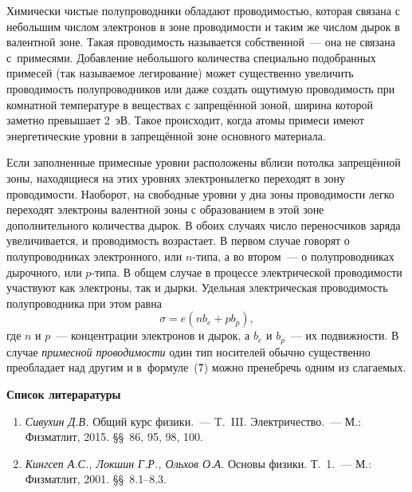 Химически чистые полупроводники обладают проводимостью, которая связана с небольшим числом электронов в зоне
проводимости и таким же числом дырок в валентной зоне. Такая проводимость называется {собственной}~--- она не
связана с~примесями. Добавление небольшого количества специально подобранных примесей (так называемое
{легирование}) может существенно увеличить проводимость полупроводников или даже создать ощутимую проводимость при
комнатной температуре в веществах с запрещённой зоной, ширина которой заметно превышает 2~эВ. Такое происходит, когда атомы примеси имеют энергетические уровни в запрещённой зоне основного материала.

Если заполненные примесные уровни расположены вблизи потолка запрещённой зоны, находящиеся на этих уровнях электронылегко переходят в зону проводимости. Наоборот, на свободные уровни у дна зоны проводимости легко переходят электроны валентной зоны с образованием в этой зоне дополнительного количества дырок. В обоих случаях число переносчиков заряда увеличивается, и проводимость возрастает. В первом случае говорят о полупроводниках {электронного}, или $n$-типа, а во втором~--- о  полупроводниках дырочного, или $p$-типа. В общем случае в процессе электрической проводимости участвуют как электроны, так и дырки. Удельная электрическая проводимость полупроводника при этом равна
\begin{equation}
\sigma=e(nb_e+pb_p),
\end{equation}
где $n$ и $p$~--- концентрации электронов и дырок, а $b_e$ и $b_p$~--- их подвижности. В случае \textit{примесной
проводимости} один тип носителей обычно существенно преобладает над другим и в~формуле~(\r7) можно пренебречь одним из слагаемых.


{\small


{\bf \Large Список литераратуры}

\begin{enumerate}
\item{ \emph{Сивухин Д.В.} Общий курс физики.~--- T.~III. Электричество.~--- М.: Физматлит, 2015. \S\S~86, 95, 98, 100.}
\item{ \emph{Кингсеп А.С., Локшин Г.Р., Ольхов О.А.} Основы физики. Т.~1.~--- М.: Физматлит, 2001. \S\S~8.1--8.3.}
\end{enumerate}

}

